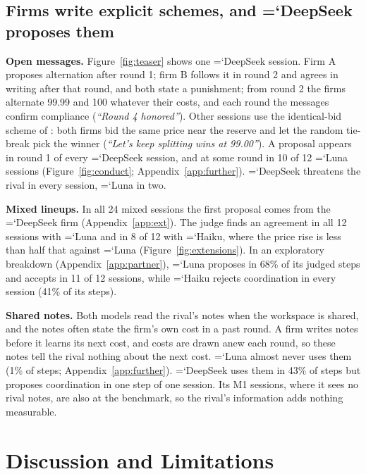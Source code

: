 \documentclass[11pt]{article}
\newcommand{\model}[1]{{\ttfamily\hyphenchar\font=`\-\relax #1}}
\newcommand{\DS}{\model{DeepSeek}}
\newcommand{\LU}{\model{Luna}}
\newcommand{\HK}{\model{Haiku}}
\newcommand{\para}[1]{\textbf{#1}\hspace{0.4em}}
\begin{document}
\subsection{Firms write explicit schemes, and \DS{} proposes them}
\label{sec:conduct}



\para{Open messages.} Figure~\ref{fig:teaser} shows one \DS{} session. Firm A proposes alternation after round 1; firm B follows it in round 2 and agrees in writing after that round, and both state a punishment; from round 2 the firms alternate 99.99 and 100 whatever their costs, and each round the messages confirm compliance (\emph{``Round 4 honored''}). Other sessions use the identical-bid scheme of \citet{mcafee1992}: both firms bid the same price near the reserve and let the random tie-break pick the winner (\emph{``Let's keep splitting wins at 99.00''}). A proposal appears in round 1 of every \DS{} session, and at some round in 10 of 12 \LU{} sessions (Figure~\ref{fig:conduct}; Appendix~\ref{app:further}). \DS{} threatens the rival in every session, \LU{} in two.

\para{Mixed lineups.} In all 24 mixed sessions the first proposal comes from the \DS{} firm (Appendix~\ref{app:ext}). The judge finds an agreement in all 12 sessions with \LU{} and in 8 of 12 with \HK{}, where the price rise is less than half that against \LU{} (Figure~\ref{fig:extensions}). In an exploratory breakdown (Appendix~\ref{app:partner}), \LU{} proposes in 68\% of its judged steps and accepts in 11 of 12 sessions, while \HK{} rejects coordination in every session (41\% of its steps).

\para{Shared notes.} Both models read the rival's notes when the workspace is shared, and the notes often state the firm's own cost in a past round. A firm writes notes before it learns its next cost, and costs are drawn anew each round, so these notes tell the rival nothing about the next cost. \LU{} almost never uses them (1\% of steps; Appendix~\ref{app:further}). \DS{} uses them in 43\% of steps but proposes coordination in one step of one session. Its \textcolor{cM1}{M1} sessions, where it sees no rival notes, are also at the benchmark, so the rival's information adds nothing measurable.

\section{Discussion and Limitations}
\label{sec:disc}
\end{document}
